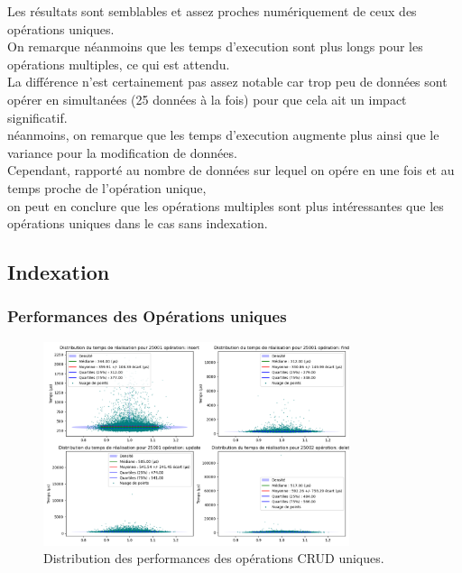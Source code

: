 \documentclass[12pt,a4paper]{report}
\begin{document}
        \begin{card}
            Les résultats sont semblables et assez proches numériquement de ceux des opérations uniques. \\
            On remarque néanmoins que les temps d'execution sont plus longs pour les opérations multiples, ce qui est attendu. \\
            La différence n'est certainement pas assez notable car trop peu de données sont opérer en simultanées (25 données à la fois) pour que cela ait un impact significatif. \\
            néanmoins, on remarque que les temps d'execution augmente plus ainsi que le variance pour la modification de données. \\
            Cependant, rapporté au nombre de données sur lequel on opére en une fois et au temps proche de l'opération unique,  \\
            on peut en conclure que les opérations multiples sont plus intéressantes que les opérations uniques dans le cas sans indexation.
        \end{card}

        \subsection{Indexation}
        
            \subsubsection{Performances des Opérations uniques}

                \begin{figure}[H]
                    \centering
                    \includegraphics[width=0.8\textwidth]{../plots/MongoDB/standalone_indexed/global_test_one.png}
                    \caption{Distribution des performances des opérations CRUD uniques.}
                    \label{fig:mongo_standalone_global_one_indexed}
                \end{figure}
\end{document}

